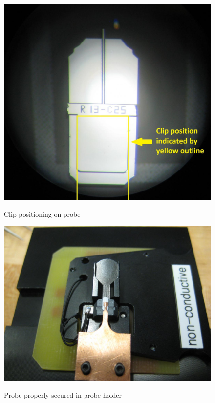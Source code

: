 \documentclass{../lab}
\begin{document}
\begin{enumerate}
    \begin{figure}[H]
    \begin{minipage}[t]{.5\linewidth}
        \centering
        \href{http://experimentationlab.berkeley.edu/sites/default/files/AFMImages/23.JPG}{\includegraphics[height=0.8\linewidth,keepaspectratio]{images/23.JPG}}
        \caption{Clip positioning on probe}
    \end{minipage}
    \begin{minipage}[t]{.5\linewidth}
        \centering
        \href{http://experimentationlab.berkeley.edu/sites/default/files/IMG_4053.JPG}{\includegraphics[height=0.8\linewidth,keepaspectratio]{images/IMG_4053.JPG}}
        \caption{Probe properly secured in probe holder}
    \end{minipage}
    \end{figure}
    

\end{enumerate}
\end{document}
